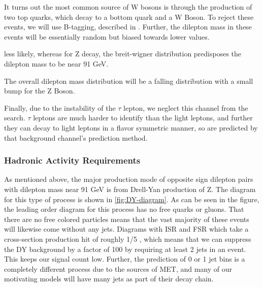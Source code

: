 It turns out the most common source of W bosons is through the production of two top quarks, which decay to a bottom quark and a W Boson. To reject these events, we will use B-tagging, described in . Further, the dilepton mass in these events will be essentially random  but biased towards lower values. 

less likely, whereas for Z decay, the breit-wigner distribution predisposes the dilepton mass to be near 91 GeV. 

The overall dilepton mass distribution will be a falling distribution with a small bump for the Z Boson. 


Finally, due to the instability of the $\tau$ lepton, we neglect this channel from the search. $\tau$ leptons are much harder to identify than the light leptons, and further they can decay to light leptons in a flavor symmetric manner, so are predicted by that background channel's prediction method.

\subsubsection{Hadronic Activity Requirements}
As mentioned above, the major production mode of opposite sign dilepton pairs with dilepton mass near 91 GeV is from Drell-Yan production of Z. The diagram for this type of process is shown in \ref{fig:DY-diagram}. As can be seen in the figure, the leading order diagram for this process has no free quarks or gluons. That there are no free colored particles means that the vast majority of these events will likewise come without any jets. Diagrams with ISR and FSR which take a cross-section production hit of roughly 1/5 , which means that we can suppress the DY background by a factor of 100 by requiring at least 2 jets in an event. This keeps our signal count low. Further, the prediction of 0 or 1 jet bins is a completely different process due to the sources of MET, and many of our motivating models will have many jets as part of their decay chain. 

